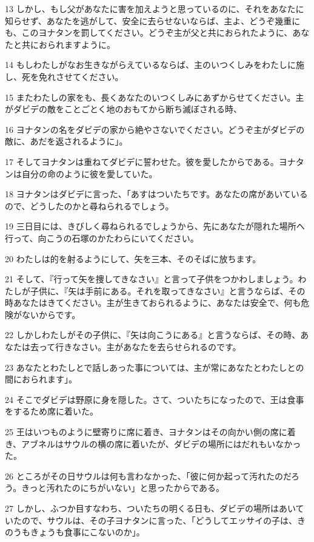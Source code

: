\par 13 しかし、もし父があなたに害を加えようと思っているのに、それをあなたに知らせず、あなたを逃がして、安全に去らせないならば、主よ、どうぞ幾重にも、このヨナタンを罰してください。どうぞ主が父と共におられたように、あなたと共におられますように。
\par 14 もしわたしがなお生きながらえているならば、主のいつくしみをわたしに施し、死を免れさせてください。
\par 15 またわたしの家をも、長くあなたのいつくしみにあずからせてください。主がダビデの敵をことごとく地のおもてから断ち滅ぼされる時、
\par 16 ヨナタンの名をダビデの家から絶やさないでください。どうぞ主がダビデの敵に、あだを返されるように」。
\par 17 そしてヨナタンは重ねてダビデに誓わせた。彼を愛したからである。ヨナタンは自分の命のように彼を愛していた。
\par 18 ヨナタンはダビデに言った、「あすはついたちです。あなたの席があいているので、どうしたのかと尋ねられるでしょう。
\par 19 三日目には、きびしく尋ねられるでしょうから、先にあなたが隠れた場所へ行って、向こうの石塚のかたわらにいてください。
\par 20 わたしは的を射るようにして、矢を三本、そのそばに放ちます。
\par 21 そして、『行って矢を捜してきなさい』と言って子供をつかわしましょう。わたしが子供に、『矢は手前にある。それを取ってきなさい』と言うならば、その時あなたはきてください。主が生きておられるように、あなたは安全で、何も危険がないからです。
\par 22 しかしわたしがその子供に、『矢は向こうにある』と言うならば、その時、あなたは去って行きなさい。主があなたを去らせられるのです。
\par 23 あなたとわたしとで話しあった事については、主が常にあなたとわたしとの間におられます」。
\par 24 そこでダビデは野原に身を隠した。さて、ついたちになったので、王は食事をするため席に着いた。
\par 25 王はいつものように壁寄りに席に着き、ヨナタンはその向かい側の席に着き、アブネルはサウルの横の席に着いたが、ダビデの場所にはだれもいなかった。
\par 26 ところがその日サウルは何も言わなかった、「彼に何か起って汚れたのだろう。きっと汚れたのにちがいない」と思ったからである。
\par 27 しかし、ふつか目すなわち、ついたちの明くる日も、ダビデの場所はあいていたので、サウルは、その子ヨナタンに言った、「どうしてエッサイの子は、きのうもきょうも食事にこないのか」。
